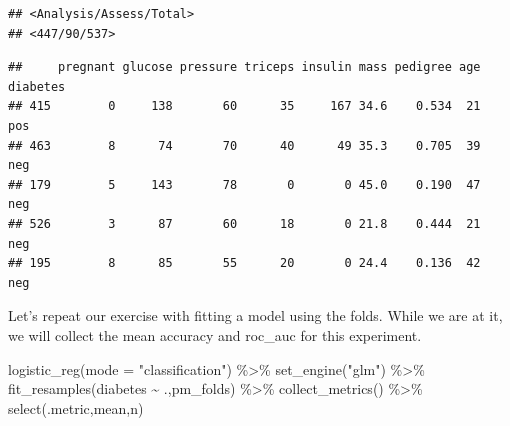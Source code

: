\documentclass[
]{article}
\newenvironment{Shaded}{\begin{snugshade}}{\end{snugshade}}
\newcommand{\AttributeTok}[1]{\textcolor[rgb]{0.77,0.63,0.00}{#1}}
\newcommand{\DecValTok}[1]{\textcolor[rgb]{0.00,0.00,0.81}{#1}}
\newcommand{\FunctionTok}[1]{\textcolor[rgb]{0.00,0.00,0.00}{#1}}
\newcommand{\NormalTok}[1]{#1}
\newcommand{\SpecialCharTok}[1]{\textcolor[rgb]{0.00,0.00,0.00}{#1}}
\newcommand{\StringTok}[1]{\textcolor[rgb]{0.31,0.60,0.02}{#1}}
\begin{document}
\begin{Shaded}
\end{Shaded}

\begin{verbatim}
## <Analysis/Assess/Total>
## <447/90/537>
\end{verbatim}

\begin{Shaded}
\end{Shaded}

\begin{verbatim}
##     pregnant glucose pressure triceps insulin mass pedigree age diabetes
## 415        0     138       60      35     167 34.6    0.534  21      pos
## 463        8      74       70      40      49 35.3    0.705  39      neg
## 179        5     143       78       0       0 45.0    0.190  47      neg
## 526        3      87       60      18       0 21.8    0.444  21      neg
## 195        8      85       55      20       0 24.4    0.136  42      neg
\end{verbatim}

Let's repeat our exercise with fitting a model using the folds. While we
are at it, we will collect the mean accuracy and roc\_auc for this
experiment.

\begin{Shaded}
\begin{Highlighting}[]
\FunctionTok{logistic\_reg}\NormalTok{(}\AttributeTok{mode =} \StringTok{"classification"}\NormalTok{) }\SpecialCharTok{\%\textgreater{}\%}
  \FunctionTok{set\_engine}\NormalTok{(}\StringTok{"glm"}\NormalTok{) }\SpecialCharTok{\%\textgreater{}\%}
  \FunctionTok{fit\_resamples}\NormalTok{(diabetes }\SpecialCharTok{\textasciitilde{}}\NormalTok{ .,pm\_folds) }\SpecialCharTok{\%\textgreater{}\%} 
  \FunctionTok{collect\_metrics}\NormalTok{() }\SpecialCharTok{\%\textgreater{}\%} 
  \FunctionTok{select}\NormalTok{(.metric,mean,n)}
\end{Highlighting}
\end{Shaded}
\end{document}
